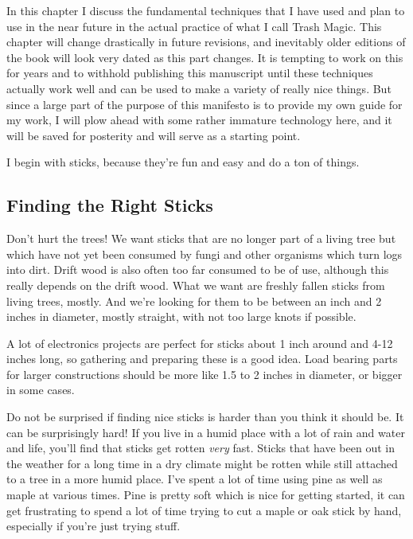 In this chapter I discuss the fundamental techniques that I have used
and plan to use in the near future in the actual practice of what I call
Trash Magic. This chapter will change drastically in future revisions,
and inevitably older editions of the book will look very dated as this
part changes. It is tempting to work on this for years and to withhold
publishing this manuscript until these techniques actually work well and
can be used to make a variety of really nice things. But since a large
part of the purpose of this manifesto is to provide my own guide for my
work, I will plow ahead with some rather immature technology here, and
it will be saved for posterity and will serve as a starting point.

I begin with sticks, because they're fun and easy and do a ton of
things.

\subsection{Finding the Right Sticks}\label{finding-the-right-sticks}

Don't hurt the trees! We want sticks that are no longer part of a living
tree but which have not yet been consumed by fungi and other organisms
which turn logs into dirt. Drift wood is also often too far consumed to
be of use, although this really depends on the drift wood. What we want
are freshly fallen sticks from living trees, mostly. And we're looking
for them to be between an inch and 2 inches in diameter, mostly
straight, with not too large knots if possible.

A lot of electronics projects are perfect for sticks about 1 inch around
and 4-12 inches long, so gathering and preparing these is a good idea.
Load bearing parts for larger constructions should be more like 1.5 to 2
inches in diameter, or bigger in some cases.

Do not be surprised if finding nice sticks is harder than you think it
should be. It can be surprisingly hard! If you live in a humid place
with a lot of rain and water and life, you'll find that sticks get
rotten \emph{very} fast. Sticks that have been out in the weather for a
long time in a dry climate might be rotten while still attached to a
tree in a more humid place. I've spent a lot of time using pine as well
as maple at various times. Pine is pretty soft which is nice for getting
started, it can get frustrating to spend a lot of time trying to cut a
maple or oak stick by hand, especially if you're just trying stuff.

